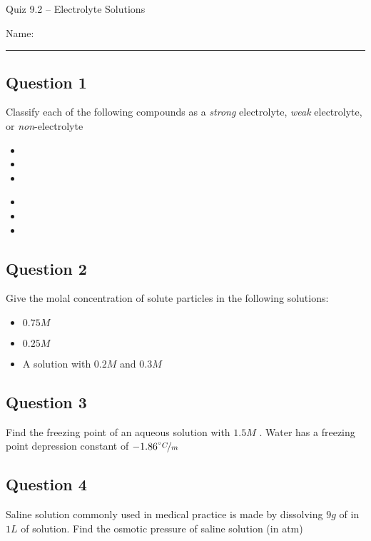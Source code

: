 \documentclass[11pt, letterpaper]{memoir}
\begin{document}
	\begin{center}
		{\large Quiz 9.2 --	Electrolyte Solutions}
	\end{center}
	{\large Name: \rule[-1mm]{4in}{.1pt} 

\subsection*{Question 1}
Classify each of the following compounds as a \emph{strong} electrolyte, \emph{weak} electrolyte, or \emph{non}-electrolyte

\noindent
\begin{minipage}{0.5\linewidth}
\begin{itemize}
	\item {}
	\item {}
	\item {}
\end{itemize}
\end{minipage}
\begin{minipage}{0.5\linewidth}
	\begin{itemize}
		\item {}
		\item {}
		\item {}
	\end{itemize}
\end{minipage}

\subsection*{Question 2}
Give the molal concentration of solute particles in the following solutions:
\begin{itemize}
	\item $0.75M$ 
	\item $0.25M$ 
	\item A solution with $0.2M$  and $0.3M$ 
\end{itemize}

\subsection*{Question 3}
Find the freezing point of an aqueous solution with $1.5M$ . Water has a freezing point depression constant of $-1.86\nicefrac{^\circ C}{m}$

\vspace{7em}
\subsection*{Question 4}
Saline solution commonly used in medical practice is made by dissolving $9g$ of  in $1L$ of solution. Find the osmotic pressure of saline solution (in atm)

}
\end{document}
